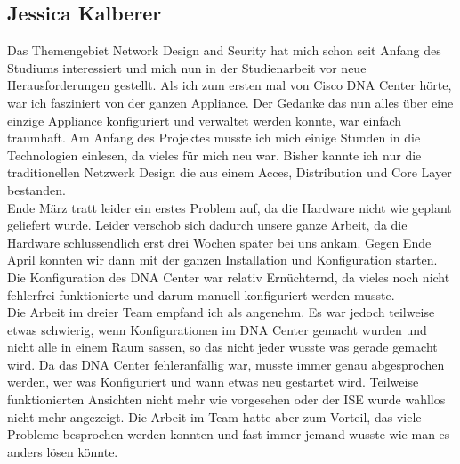 \subsection{Jessica Kalberer}
Das Themengebiet Network Design and Seurity hat mich schon seit Anfang des Studiums interessiert und mich nun in der Studienarbeit vor neue Herausforderungen gestellt. Als ich zum ersten mal von Cisco DNA Center hörte, war ich fasziniert von der ganzen Appliance. Der Gedanke das nun alles über eine einzige Appliance konfiguriert und verwaltet werden konnte, war einfach traumhaft. Am Anfang des Projektes musste ich mich einige Stunden in die  Technologien einlesen, da vieles für mich neu war. Bisher kannte ich nur die traditionellen Netzwerk Design die aus einem Acces, Distribution und Core Layer bestanden.\\ 
Ende März tratt leider ein erstes Problem auf, da die Hardware nicht wie geplant geliefert wurde. Leider verschob sich dadurch unsere ganze Arbeit, da die Hardware schlussendlich erst drei Wochen später bei uns ankam. Gegen Ende April konnten wir dann mit der ganzen Installation und Konfiguration starten. Die Konfiguration des DNA Center war relativ Ernüchternd, da vieles noch nicht fehlerfrei funktionierte und darum manuell konfiguriert werden musste. \\
Die Arbeit im dreier Team empfand ich als angenehm. Es war jedoch teilweise etwas schwierig, wenn Konfigurationen im DNA Center gemacht wurden und nicht alle in einem Raum sassen, so das nicht jeder wusste was gerade gemacht wird. Da das DNA Center fehleranfällig war, musste immer genau abgesprochen werden, wer was Konfiguriert und wann etwas neu gestartet wird. Teilweise funktionierten Ansichten nicht mehr wie vorgesehen oder der ISE wurde wahllos nicht mehr angezeigt. Die Arbeit im Team hatte aber zum Vorteil, das viele Probleme besprochen werden konnten und fast immer jemand wusste wie man es anders lösen könnte.